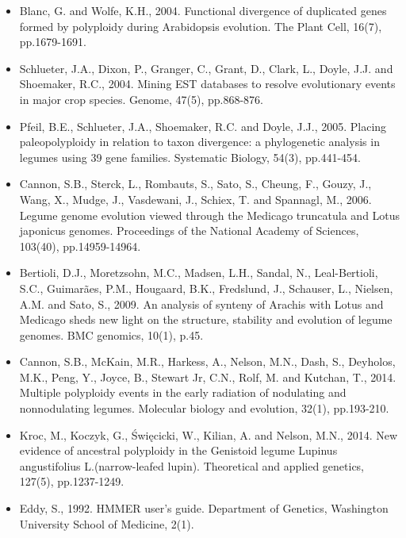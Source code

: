\documentclass{article}
\begin{document}
\begin{itemize}
			\item Blanc, G. and Wolfe, K.H., 2004. Functional divergence of duplicated genes formed by polyploidy during Arabidopsis evolution. The Plant Cell, 16(7), pp.1679-1691.
			
			\item Schlueter, J.A., Dixon, P., Granger, C., Grant, D., Clark, L., Doyle, J.J. and Shoemaker, R.C., 2004. Mining EST databases to resolve evolutionary events in major crop species. Genome, 47(5), pp.868-876.
			
			\item Pfeil, B.E., Schlueter, J.A., Shoemaker, R.C. and Doyle, J.J., 2005. Placing paleopolyploidy in relation to taxon divergence: a phylogenetic analysis in legumes using 39 gene families. Systematic Biology, 54(3), pp.441-454.
			
			\item Cannon, S.B., Sterck, L., Rombauts, S., Sato, S., Cheung, F., Gouzy, J., Wang, X., Mudge, J., Vasdewani, J., Schiex, T. and Spannagl, M., 2006. Legume genome evolution viewed through the Medicago truncatula and Lotus japonicus genomes. Proceedings of the National Academy of Sciences, 103(40), pp.14959-14964.
			
			\item Bertioli, D.J., Moretzsohn, M.C., Madsen, L.H., Sandal, N., Leal-Bertioli, S.C., Guimarães, P.M., Hougaard, B.K., Fredslund, J., Schauser, L., Nielsen, A.M. and Sato, S., 2009. An analysis of synteny of Arachis with Lotus and Medicago sheds new light on the structure, stability and evolution of legume genomes. BMC genomics, 10(1), p.45.
			
			\item Cannon, S.B., McKain, M.R., Harkess, A., Nelson, M.N., Dash, S., Deyholos, M.K., Peng, Y., Joyce, B., Stewart Jr, C.N., Rolf, M. and Kutchan, T., 2014. Multiple polyploidy events in the early radiation of nodulating and nonnodulating legumes. Molecular biology and evolution, 32(1), pp.193-210.
			
			\item Kroc, M., Koczyk, G., Święcicki, W., Kilian, A. and Nelson, M.N., 2014. New evidence of ancestral polyploidy in the Genistoid legume Lupinus angustifolius L.(narrow-leafed lupin). Theoretical and applied genetics, 127(5), pp.1237-1249.
			
			\item Eddy, S., 1992. HMMER user’s guide. Department of Genetics, Washington University School of Medicine, 2(1).
			

\end{itemize}
\end{document}
